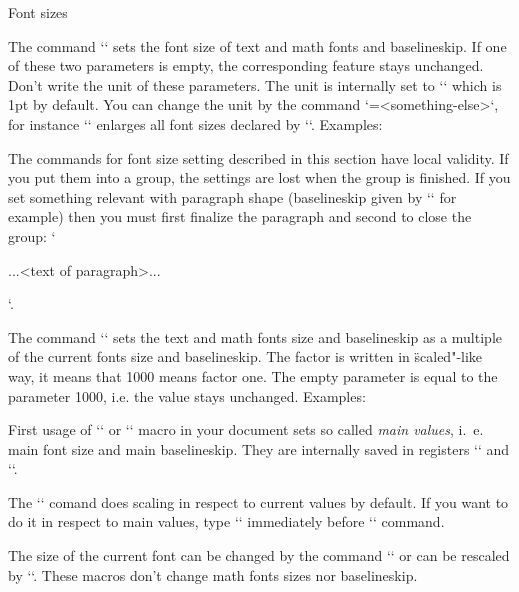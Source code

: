 \secc Font sizes

The command `` sets the font size of text and
math fonts and baselineskip. If one of these two parameters is empty, the
corresponding feature stays unchanged. Don't write the unit of these
parameters. The unit is internally set to `\ptunit` which is 1pt by default.
You can change the unit by the command `\ptunit=<something-else>`, 
for instance `\ptunit=1mm` enlarges all font sizes declared by `\typosize`.
Examples:

\begtt
\typosize[10/12]   %
\typosize[11/12.5] %
\typosize[8/]      %
\endtt

The commands for font size setting described in this section
have local validity. If you put them into a group, 
the settings are lost when the group is finished. If you set 
something relevant with paragraph shape (baselineskip given by 
`\typosize` for example) then you must first finalize the 
paragraph and second to close the group: 
`{\typosize[12/14] ...<text of paragraph>... \par}`. 

The command
``
sets the text and math fonts
size and baselineskip as a multiple of the current fonts size and
baselineskip. The factor is written in \"scaled"-like way, it means that 1000
means factor one. The empty parameter is equal to the parameter 1000,
i.e. the value stays unchanged. Examples:

\begtt
\typoscale[800/800]    %
\typoscale[\magstep2/] %
\endtt

First usage of `\typosize` or `\typoscale` macro in your document sets so
called {\em main values}, i.~e. main font size and main baselineskip. They are internally 
saved in registers `\mainfosize` and `\mainbaselineskip`. 

\new
The `\typoscale` comand does scaling in respect to current values by default. 
If you want to do it in respect to main values, type `\scalemain` immediately
before `\typoscale` command.

\begtt
\typosize[12/14.4] %
\typosize[15/18]   %
\scalemain \typoscale[800/800] %
\endtt

The size of the current font can be changed by the command
`` or can be rescaled by
`\thefontscale[<factor>]`. These macros don't change math fonts sizes nor
baselineskip.

